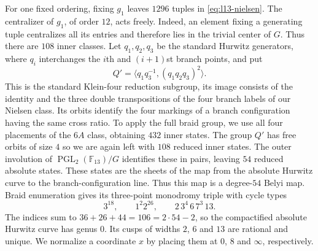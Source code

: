 \documentclass[10pt]{amsart}
\numberwithin{equation}{section}
\theoremstyle{definition}
\theoremstyle{remark}
\newcommand{\F}{\mathbb{F}}
\newcommand{\PGL}{\operatorname{PGL}}
\begin{document}
For one fixed ordering, fixing $g_1$ leaves $1296$ tuples in
\eqref{eq:l13-nielsen}. The centralizer of $g_1$, of order $12$, acts freely.
Indeed, an element fixing a generating tuple centralizes all its entries and
therefore lies in the trivial center of $G$. Thus there are $108$ inner
classes.  Let $q_1,q_2,q_3$ be the standard Hurwitz generators,
where $q_i$ interchanges the $i$th and $(i+1)$st branch points, and put
\[
 Q'=\bigl\langle q_1q_3^{-1},(q_1q_2q_3)^2\bigr\rangle .
\]
This is the standard Klein-four reduction subgroup, its image consists of the identity and the three double
transpositions of the four branch labels of our Nielsen class.  Its orbits identify the four
markings of a branch configuration having the same cross ratio. To apply
the full braid group, we use all four placements of the $6A$ class,
obtaining $432$ inner states. The group $Q'$ has free orbits of size $4$ so we are again left with $108$ reduced inner states.  The outer involution of $\PGL_2(\F_{13})/G$ identifies these in
pairs, leaving $54$ reduced absolute states. These states are the sheets of
the map from the absolute Hurwitz curve to the branch-configuration line.
Thus this map is a degree-$54$ Belyi map. Braid enumeration gives its
three-point monodromy triple with cycle types
\begin{equation}\label{eq:l13-hurwitz-passport}
 3^{18},\qquad 1^2 2^{26},\qquad 2\,3^4\,6\,7^3\,13 .
\end{equation}
The indices sum to $36+26+44=106=2\cdot54 - 2$, so the compactified absolute
Hurwitz curve has genus $0$. Its cusps of widths $2$, $6$ and $13$ are
rational and unique. We normalize a coordinate $x$ by placing them at
$0$, $8$ and $\infty$, respectively.
\end{document}
